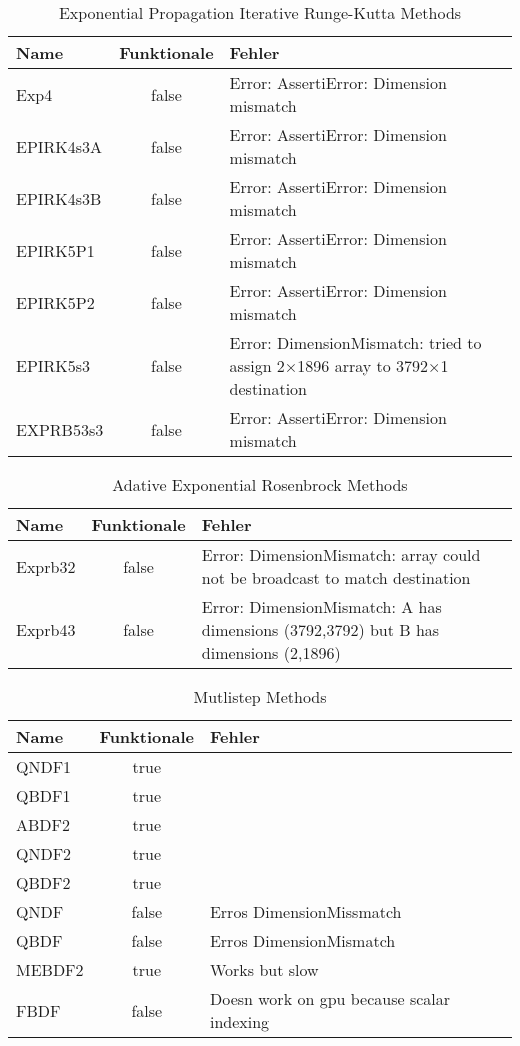\begin{table}[H]
    \centering

    \begin{tabular}{p{5cm}|c|p{5cm}}
        Name & Funktionale & Fehler \\
        \hline\hline
        Exp4      & false & Error: AssertiError: Dimension mismatch \\
        EPIRK4s3A & false & Error: AssertiError: Dimension mismatch \\
        EPIRK4s3B & false & Error: AssertiError: Dimension mismatch \\
        EPIRK5P1  & false & Error: AssertiError: Dimension mismatch \\
        EPIRK5P2  & false & Error: AssertiError: Dimension mismatch \\
        EPIRK5s3  & false & Error: DimensionMismatch: tried to assign 2×1896 array to 3792×1 destination \\
        EXPRB53s3 & false & Error: AssertiError: Dimension mismatch \\
    \end{tabular}
    \caption{Exponential Propagation Iterative Runge-Kutta Methods}
    \label{tab:my_label}
\end{table}

\begin{table}[H]
    \centering

    \begin{tabular}{p{5cm}|c|p{5cm}}
        Name & Funktionale & Fehler \\
        \hline\hline
        Exprb32 & false & Error: DimensionMismatch: array could not be broadcast to match destination \\
        Exprb43 & false & Error: DimensionMismatch: A has dimensions (3792,3792) but B has dimensions (2,1896) \\       
    \end{tabular}
    \caption{Adative Exponential Rosenbrock Methods}
    \label{tab:my_label}
\end{table}

\begin{table}[H]
    \centering

    \begin{tabular}{p{5cm}|c|p{5cm}}
        Name & Funktionale & Fehler \\
        \hline\hline
        QNDF1 & true   & \\
        QBDF1 & true   & \\
        ABDF2 & true   & \\
        QNDF2 & true   & \\
        QBDF2 & true   & \\
        QNDF  & false  & Erros DimensionMissmatch \\
        QBDF  & false  & Erros DimensionMismatch \\
        MEBDF2& true  & Works but slow \\
        FBDF  & false  & Doesn work on gpu because scalar indexing \\
    \end{tabular}
    \caption{Mutlistep Methods}
    \label{tab:my_label}
\end{table}

